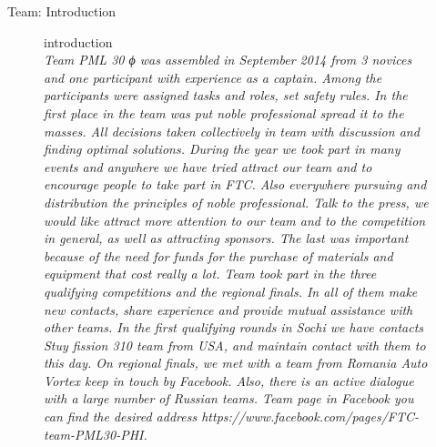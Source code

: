 \large Team:
\large  Introduction
	\begin{figure}[H]
		introduction\\
		\emph{Team PML 30 ϕ was assembled in September 2014 from 3 novices and one participant with experience as a captain. Among the participants were assigned tasks and roles, 			set safety rules. In the first place in the team was put noble professional spread it to the masses.  All decisions taken collectively in team with discussion and finding optimal 			 	solutions. 
		During the year we took part in many events and anywhere we have tried attract our team and to encourage people to take part in FTC. Also everywhere pursuing and 				distribution the principles of noble professional. Talk to the press, we would like attract more attention to our team and to the competition in general, as well as attracting 				sponsors. The last was important because of the need for funds for the purchase of materials and equipment that cost really a lot.
		Team took part in the three qualifying competitions and the regional finals. In all of them make new contacts, share experience and provide mutual assistance with other teams. 
		In the first qualifying rounds in Sochi we have contacts Stuy  fission 310 team from USA, and maintain contact with them to this day. On regional finals, we met with a team from 			Romania Auto Vortex keep in touch by Facebook. Also, there is an active dialogue with a large number of Russian teams. Team page in Facebook you can find the desired address 			https://www.facebook.com/pages/FTC-team-PML30-PHI.
}
 
\end{figure}
